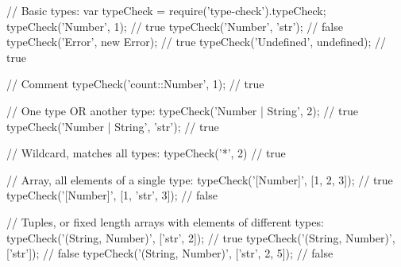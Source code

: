 \begin{DoxyCode}
\textcolor{comment}{// Basic types:}
var typeCheck = require(\textcolor{stringliteral}{'type-check'}).typeCheck;
typeCheck(\textcolor{stringliteral}{'Number'}, 1);               \textcolor{comment}{// true}
typeCheck(\textcolor{stringliteral}{'Number'}, \textcolor{stringliteral}{'str'});           \textcolor{comment}{// false}
typeCheck(\textcolor{stringliteral}{'Error'}, \textcolor{keyword}{new} Error);        \textcolor{comment}{// true}
typeCheck(\textcolor{stringliteral}{'Undefined'}, undefined);    \textcolor{comment}{// true}

\textcolor{comment}{// Comment}
typeCheck(\textcolor{stringliteral}{'count::Number'}, 1);        \textcolor{comment}{// true}

\textcolor{comment}{// One type OR another type:}
typeCheck(\textcolor{stringliteral}{'Number | String'}, 2);      \textcolor{comment}{// true}
typeCheck(\textcolor{stringliteral}{'Number | String'}, \textcolor{stringliteral}{'str'});  \textcolor{comment}{// true}

\textcolor{comment}{// Wildcard, matches all types:}
typeCheck(\textcolor{charliteral}{'*'}, 2) \textcolor{comment}{// true}

\textcolor{comment}{// Array, all elements of a single type:}
typeCheck('[Number]', [1, 2, 3]);                \textcolor{comment}{// true}
typeCheck('[Number]', [1, 'str', 3]);            \textcolor{comment}{// false}

\textcolor{comment}{// Tuples, or fixed length arrays with elements of different types:}
typeCheck('(String, Number)', ['str', 2]);       \textcolor{comment}{// true}
typeCheck('(String, Number)', ['str']);          \textcolor{comment}{// false}
typeCheck('(String, Number)', ['str', 2, 5]);    \textcolor{comment}{// false}


\end{DoxyCode}

